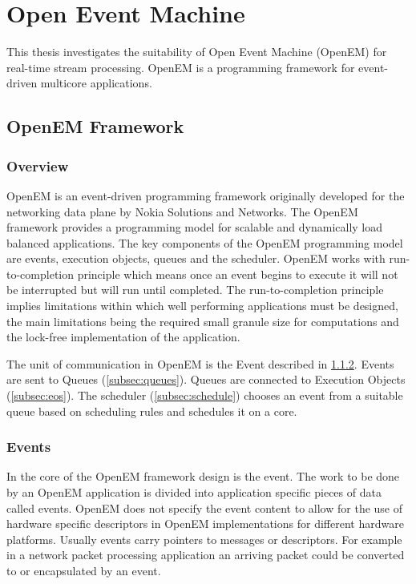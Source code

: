 \chapter{Open Event Machine}
\label{chapter:openem}
This thesis investigates the suitability of Open Event Machine (OpenEM) for
real-time stream processing. OpenEM is a programming framework for event-driven
multicore applications.

\section{OpenEM Framework}
\subsection{Overview}
OpenEM is an event-driven programming framework originally developed for the
networking data plane by Nokia Solutions and Networks. The OpenEM framework
provides a programming model for scalable and dynamically load balanced
applications. The key components of the OpenEM programming model are events,
execution objects, queues and the scheduler. OpenEM works with
run-to-completion principle which means once an event begins to execute it will
not be interrupted but will run until completed. The run-to-completion
principle implies limitations within which well performing applications must be
designed, the main limitations being the required small granule size for
computations and the lock-free implementation of the application.
\cite{openempage}

The unit of communication in OpenEM is the Event described in
\ref{subsec:event}. Events are sent to Queues (\ref{subsec:queues}). Queues are
connected to Execution Objects (\ref{subsec:eos}). The scheduler
(\ref{subsec:schedule}) chooses an event from a suitable queue based on
scheduling rules and schedules it on a core.

\subsection{Events}
\label{subsec:event}
In the core of the OpenEM framework design is the event. The work to be done by
an OpenEM application is divided into application specific pieces of data
called events. OpenEM does not specify the event content to allow for the use
of hardware specific descriptors in OpenEM implementations for different
hardware platforms. Usually events carry pointers to messages or descriptors.
\cite{openemintro} For example in a network packet processing application an
arriving packet could be converted to or encapsulated by an event.

